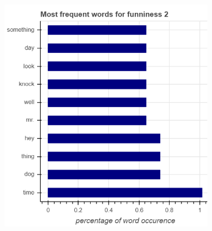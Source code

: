 \documentclass[draft,final,oneside]{vutinfth} %
\begin{document}
\begin{figure}
\begin{subfigure}[b]{0.45\textwidth}
\includegraphics[width=1.0\textwidth]{graphics/word_occurence/funniness_2}
\end{subfigure}


\end{figure}
\end{document}
